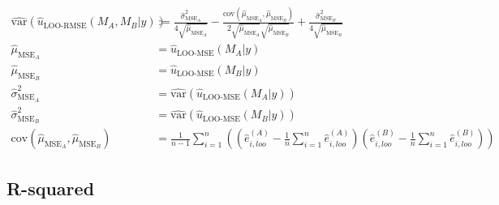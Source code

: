 \documentclass{article}
\newcommand{\residual}[2][i]{\hat{e}_{#1}^{(#2)}}
\begin{document}
\begin{equation}
\begin{aligned}
\widehat{\text{var}} \left( \hat{u}_{\text{LOO-RMSE}}(M_A, M_B | y) \right) &:=  \frac{\hat{\sigma}^2_{\text{MSE}_A}}{4\sqrt{\hat{\mu}_{\text{MSE}_A}}} - 
\frac{\text{cov}(\hat{\mu}_{\text{MSE}_A},\hat{\mu}_{\text{MSE}_B})}{2 \sqrt{\hat{\mu}_{\text{MSE}_A}} \sqrt{\hat{\mu}_{\text{MSE}_B}}} + 
\frac{\hat{\sigma}^2_{\text{MSE}_B}}{4\sqrt{\hat{\mu}_{\text{MSE}_B}}} \\
\hat{\mu}_{\text{MSE}_A} &= \hat{u}_{\text{LOO-MSE}}(M_A | y)\\
\hat{\mu}_{\text{MSE}_B} &= \hat{u}_{\text{LOO-MSE}}(M_B | y)\\
\hat{\sigma}^2_{\text{MSE}_A} &= \widehat{\text{var}}\left(\hat{u}_{\text{LOO-MSE}}(M_A | y)\right) \\
\hat{\sigma}^2_{\text{MSE}_B} &= \widehat{\text{var}}\left(\hat{u}_{\text{LOO-MSE}}(M_B | y)\right) \\
\text{cov}(\hat{\mu}_{\text{MSE}_A},\hat{\mu}_{\text{MSE}_B}) &= \frac{1}{n -1 } \sum_{i = 1}^n \left( \left( \residual[i,loo]{A} - \frac{1}{n} \sum_{i=1}^n \residual[i,loo]{A} \right) \left( \residual[i,loo]{B} - \frac{1}{n} \sum_{i=1}^n \residual[i,loo]{B} \right) \right)
\end{aligned}\label{eq:var-loo-diff-rmse}
\end{equation}

\subsection{R-squared}

\end{document}
